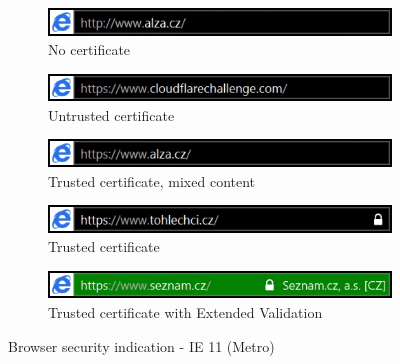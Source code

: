 \begin{figure}
  \begin{subfigure}[b]{\textwidth}
    \centering
    \includegraphics[scale=0.6]{images/browsers/iemetro-none.png}
    \caption{No certificate}
  \end{subfigure}
  \begin{subfigure}[b]{\textwidth}
    \centering
    \includegraphics[scale=0.6]{images/browsers/iemetro-untrusted.png}
    \caption{Untrusted certificate}
  \end{subfigure}
  \begin{subfigure}[b]{\textwidth}
    \centering
    \includegraphics[scale=0.6]{images/browsers/iemetro-mixed.png}
    \caption{Trusted certificate, mixed content}
  \end{subfigure}
  \begin{subfigure}[b]{\textwidth}
    \centering
    \includegraphics[scale=0.6]{images/browsers/iemetro-dv.png}
    \caption{Trusted certificate}
  \end{subfigure}
  \begin{subfigure}[b]{\textwidth}
    \centering
    \includegraphics[scale=0.6]{images/browsers/iemetro-ev.png}
    \caption{Trusted certificate with Extended Validation}
  \end{subfigure}
  \caption{Browser security indication - IE 11 (Metro)}
\end{figure}

